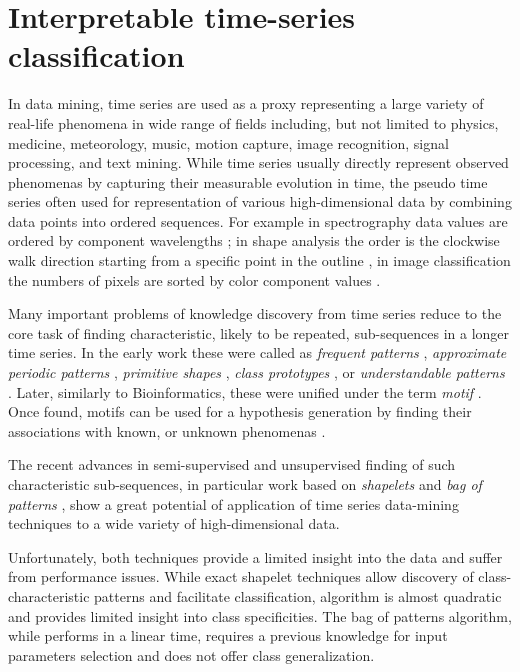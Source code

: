 %
%
\section{Interpretable time-series classification}\label{section_knowledge_discovery}
In data mining, time series are used as a proxy representing a large variety of real-life phenomena 
in wide range of fields including, but not limited to physics, medicine, meteorology, 
music, motion capture, image recognition, signal processing, and text mining. 
While time series usually directly represent observed phenomenas by capturing their measurable evolution 
in time, the pseudo time series often used for representation of various high-dimensional data 
by combining data points into ordered sequences. 
For example in spectrography data values are ordered by component wavelengths \cite{citeulike:12550833};
in shape analysis the order is the clockwise walk direction starting from a
specific point in the outline \cite{citeulike:12550835}, in image classification the numbers of pixels
are sorted by color component values \cite{citeulike:2900542}.

Many important problems of knowledge discovery from time series reduce to the core task of finding 
characteristic, likely to be repeated, sub-sequences in a longer time series. 
In the early work these were called as 
\textit{frequent patterns} \cite{citeulike:5159615}, 
\textit{approximate periodic patterns} \cite{citeulike:1959582},
\textit{primitive shapes} \cite{citeulike:5898869}, 
\textit{class prototypes} \cite{citeulike:4406444}, 
or \textit{understandable patterns} \cite{citeulike:3978076}. 
Later, similarly to Bioinformatics, these were unified under the term \textit{motif} \cite{citeulike:3977965}.
Once found, motifs can be used for a hypothesis generation by finding their associations with known,
or unknown phenomenas \cite{citeulike:3977965}. 

The recent advances in semi-supervised and unsupervised finding of such characteristic sub-sequences, 
in particular work based on \textit{shapelets} \cite{citeulike:7344347} \cite{citeulike:11957982}
\cite{citeulike:12552293} and \textit{bag of patterns} \cite{citeulike:10525778}, show a great potential 
of application of time series data-mining techniques to a wide variety of high-dimensional data.

Unfortunately, both techniques provide a limited insight into the data and suffer from performance issues. 
While exact shapelet techniques allow discovery of class-characteristic patterns and facilitate classification,
algorithm is almost quadratic and provides limited insight into class specificities. 
The bag of patterns algorithm, while performs in a linear time, requires a previous knowledge for input parameters 
selection and does not offer class generalization.


